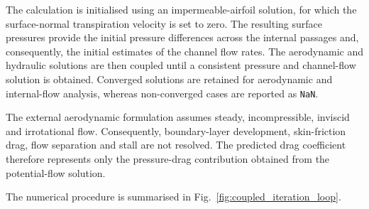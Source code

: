 \documentclass[a4paper,fleqn]{cas-dc}
\begin{document}
The calculation is initialised using an impermeable-airfoil solution,
for which the surface-normal transpiration velocity is set to zero.
The resulting surface pressures provide the initial pressure differences
across the internal passages and, consequently, the initial estimates
of the channel flow rates. The aerodynamic and hydraulic solutions are
then coupled until a consistent pressure and channel-flow solution is
obtained. Converged solutions are retained for aerodynamic and
internal-flow analysis, whereas non-converged cases are reported as
\texttt{NaN}.

The external aerodynamic formulation assumes steady, incompressible,
inviscid and irrotational flow. Consequently, boundary-layer
development, skin-friction drag, flow separation and stall are not
resolved. The predicted drag coefficient therefore represents only the
pressure-drag contribution obtained from the potential-flow solution.

The numerical procedure is summarised in
Fig.~\ref{fig:coupled_iteration_loop}.
\end{document}
